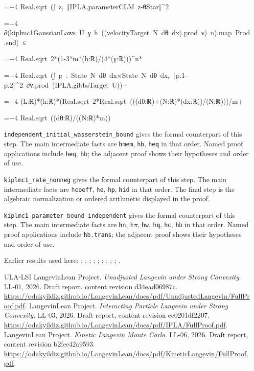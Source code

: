 \documentclass[11pt,a4paper]{article}
\newlength{\leancharwidth}
\newenvironment{leancode}{\par\smallskip\begingroup\ttfamily\footnotesize\raggedright
  \settowidth{\leancharwidth}{M}\setlength{\parskip}{0pt}\setlength{\parindent}{0pt}
  \frenchspacing}{\par\endgroup\smallskip}
\newcommand{\leanline}[2]{\hangindent=\dimexpr#1\leancharwidth+4\leancharwidth\relax
  \hangafter=1\noindent\hspace*{#1\leancharwidth}#2\par}
\newcommand{\leanlabel}[1]{\par\smallskip\noindent{\small\bfseries #1}\par}
\begin{document}
\begin{leanbox}
\begin{leancode}
\leanline{4}{Real.sqrt\ (∫\ z,\ ‖IPLA.parameterCLM\ z-θStar‖\textasciicircum{}2}
\leanline{6}{∂(kiplmc1GaussianLaws\ U\ γ\ h\ ((velocityTarget\ N\ dθ\ dx).prod\ ν)\ n).map\ Prod.snd)\ ≤}
\leanline{6}{Real.sqrt\ 2*(1-3*m*(h:ℝ)/(4*(γ:ℝ)))\textasciicircum{}n*}
\leanline{8}{Real.sqrt\ (∫\ p\ :\ State\ N\ dθ\ dx×State\ N\ dθ\ dx,\ ‖p.1-p.2‖\textasciicircum{}2\ ∂ν.prod\ (IPLA.gibbsTarget\ U))+}
\leanline{6}{(L:ℝ)*(h:ℝ)*(Real.sqrt\ 2*Real.sqrt\ (((dθ:ℝ)+(N:ℝ)*(dx:ℝ))/(N:ℝ)))/m+}
\leanline{6}{Real.sqrt\ ((dθ:ℝ)/((N:ℝ)*m))}
\end{leancode}
\leanlabel{How the Lean proof follows the argument}
\texttt{independent\_\allowbreak{}initial\_\allowbreak{}wasserstein\_\allowbreak{}bound} gives the formal counterpart of this step. The main intermediate facts are \texttt{hmem}, \texttt{hb}, \texttt{heq} in that order. Named proof applications include \texttt{heq}, \texttt{hb}; the adjacent proof shows their hypotheses and order of use.




\texttt{kiplmc1\_\allowbreak{}rate\_\allowbreak{}nonneg} gives the formal counterpart of this step. The main intermediate facts are \texttt{hcoeff}, \texttt{he}, \texttt{hp}, \texttt{hid} in that order. The final step is the algebraic normalization or ordered arithmetic displayed in the proof.




\texttt{kiplmc1\_\allowbreak{}parameter\_\allowbreak{}bound\_\allowbreak{}independent} gives the formal counterpart of this step. The main intermediate facts are \texttt{hn}, \texttt{h\ensuremath{\pi}}, \texttt{hw}, \texttt{hq}, \texttt{hc}, \texttt{hb} in that order. Named proof applications include \texttt{hb.\allowbreak{}trans}; the adjacent proof shows their hypotheses and order of use.
\end{leanbox}


Earlier results used here: \cite[Section~3.17.11]{LangevinLean2026ULASC}; \cite[Section~3.17.4]{LangevinLean2026ULASC}; \cite[Section~3.26.15]{LangevinLean2026ULASC}; \cite[Section~3.1.1]{LangevinLean2026IPLA}; \cite[Section~3.1.3]{LangevinLean2026IPLA}; \cite[Section~3.1.6]{LangevinLean2026IPLA}; \cite[Section~3.3.1]{LangevinLean2026IPLA}; \cite[Section~3.3.2]{LangevinLean2026IPLA}; \cite[Section~3.5.1]{LangevinLean2026IPLA}; \cite[Section~3.41.2]{LangevinLean2026Kinetic}.

\begin{thebibliography}{ULA-LSI}
LangevinLean Project. \emph{Unadjusted Langevin under Strong Convexity}. LL-01, 2026. Draft report, content revision d34ead06987c. \url{https://odakyildiz.github.io/LangevinLean/docs/pdf/UnadjustedLangevin/FullProof.pdf}.
LangevinLean Project. \emph{Interacting Particle Langevin under Strong Convexity}. LL-03, 2026. Draft report, content revision ec0201df2207. \url{https://odakyildiz.github.io/LangevinLean/docs/pdf/IPLA/FullProof.pdf}.
LangevinLean Project. \emph{Kinetic Langevin Monte Carlo}. LL-06, 2026. Draft report, content revision b2fee42a9593. \url{https://odakyildiz.github.io/LangevinLean/docs/pdf/KineticLangevin/FullProof.pdf}.
\end{thebibliography}
\end{document}
